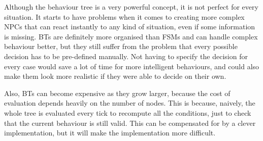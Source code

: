 Although the behaviour tree is a very powerful concept, it is not perfect for every situation. It starts to have problems when it comes to creating more complex NPCs that can react instantly to any kind of situation, even if some information is missing. BTs are definitely more organised than FSMs and can handle complex behaviour better, but they still suffer from the problem that every possible decision has to be pre-defined manually. Not having to specify the decision for every case would save a lot of time for more intelligent behaviours, and could also make them look more realistic if they were able to decide on their own.

Also, BTs can become expensive as they grow larger, because the cost of evaluation depends heavily on the number of nodes. This is because, naively, the whole tree is evaluated every tick to recompute all the conditions, just to check that the current behaviour is still valid. This can be compensated for by a clever implementation, but it will make the implementation more difficult.
